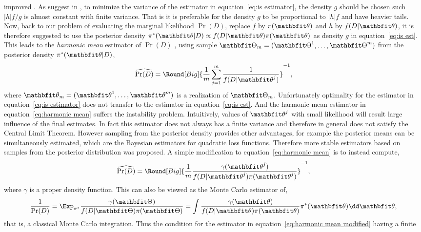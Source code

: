 improved \parencite{Casella1998}. As suggest in
\textcite[][sec.~3.3]{Robert2004}, to minimize the variance of the estimator
in equation~\eqref{eq:is estimator}, the density $g$ should be chosen such
$|h|f/g$ is almost constant with finite variance. That is it is preferable for
the density $g$ to be proportional to $|h|f$ and have heavier tails. Now, back
to our problem of evaluating the marginal likelihood $\Pr(D)$, replace $f$ by
$\pi(\bth)$ and $h$ by $f(D|\bth)$, it is therefore suggested to use the
posterior density $\pi^*(\bth|D) \propto f(D|\bth)\pi(\bth)$ as density $g$ in
equation~\eqref{eq:is est}. This leads to the \emph{harmonic mean} estimator
of $\Pr(D)$ \parencite{Newton1994}, using sample $\bTh_m= \bThm$ from the
posterior density $\pi^*(\bth|D)$,
\begin{equation}
  \widehat{\Pr(D)} =
  \Round[Big]{\frac{1}{m}\sum_{j=1}^m\frac{1}{f(D|\bth^j)}}^{-1},
  \label{eq:harmonic mean}
\end{equation}
where $\bth_m = \bthm$ is a realization of $\bTh_m$. Unfortunately optimality
for the estimator in equation~\eqref{eq:is estimator} does not transfer to the
estimator in equation~\eqref{eq:is est}. And the harmonic mean estimator in
equation~\eqref{eq:harmonic mean} suffers the instability problem.
Intuitively, values of $\bth^j$ with small likelihood will result large
influence of the final estimates. In fact this estimator does not always has a
finite variance and therefore in general does not satisfy the Central Limit
Theorem. However sampling from the posterior density provides other
advantages, for example the posterior means can be simultaneously estimated,
which are the Bayesian estimators for quadratic loss functions. Therefore more
stable estimators based on samples from the posterior distribution was
proposed. A simple modification to equation~\eqref{eq:harmonic mean} is to
instead compute,
\begin{equation}
  \widehat{\Pr(D)} = \Round[Big]{
    \frac{1}{m}\frac{\gamma(\bth^j)}{f(D|\bth^j)\pi(\bth^j)}}^{-1},
  \label{eq:harmonic mean modified}
\end{equation}
where $\gamma$ is a proper density function. This can also be viewed as the
Monte Carlo estimator of,
\begin{equation}
  \frac{1}{\Pr(D)}
  = \Exp_{\pi^*}\frac{\gamma(\bTh)}{f(D|\bTh)\pi(\bTh)}
  = \int\frac{\gamma(\bth)}{f(D|\bth)\pi(\bth)}\pi^*(\bth)\dd\bth,
\end{equation}
that is, a classical Monte Carlo integration. Thus the condition for the
estimator in equation~\eqref{eq:harmonic mean modified} having a finite
